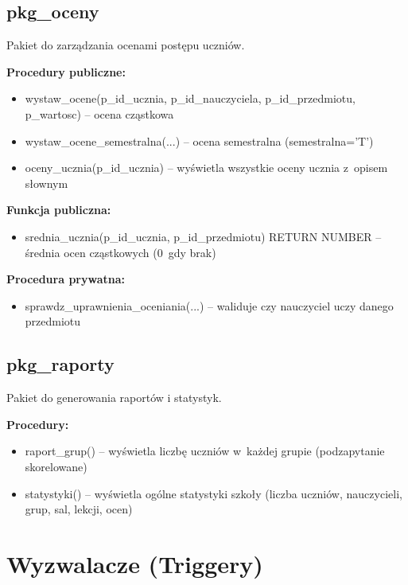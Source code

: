 \documentclass[12pt,a4paper]{article}
\begin{document}
\subsection{pkg\_oceny}

Pakiet do zarządzania ocenami postępu uczniów.

\textbf{Procedury publiczne:}
\begin{itemize}[nosep]
    \item wystaw\_ocene(p\_id\_ucznia, p\_id\_nauczyciela, p\_id\_przedmiotu, p\_wartosc) -- ocena cząstkowa
    \item wystaw\_ocene\_semestralna(...) -- ocena semestralna (semestralna='T')
    \item oceny\_ucznia(p\_id\_ucznia) -- wyświetla wszystkie oceny ucznia z~opisem słownym
\end{itemize}

\textbf{Funkcja publiczna:}
\begin{itemize}[nosep]
    \item srednia\_ucznia(p\_id\_ucznia, p\_id\_przedmiotu) RETURN NUMBER -- średnia ocen cząstkowych (0~gdy brak)
\end{itemize}

\textbf{Procedura prywatna:}
\begin{itemize}[nosep]
    \item sprawdz\_uprawnienia\_oceniania(...) -- waliduje czy nauczyciel uczy danego przedmiotu
\end{itemize}

\subsection{pkg\_raporty}

Pakiet do generowania raportów i statystyk.

\textbf{Procedury:}
\begin{itemize}[nosep]
    \item raport\_grup() -- wyświetla liczbę uczniów w~każdej grupie (podzapytanie skorelowane)
    \item statystyki() -- wyświetla ogólne statystyki szkoły (liczba uczniów, nauczycieli, grup, sal, lekcji, ocen)
\end{itemize}

\newpage
\section{Wyzwalacze (Triggery)}
\end{document}
